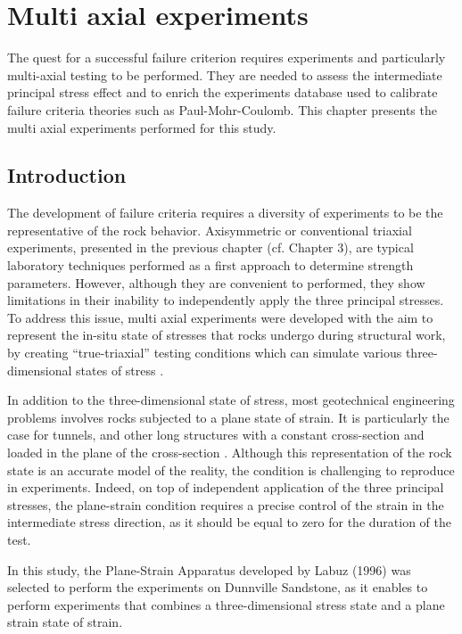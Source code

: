 \chapter{Multi axial experiments}\label{ch4:title}

The quest for a successful failure criterion requires experiments and particularly multi-axial testing \cite{Labuz2018} to be performed. They are needed to assess the intermediate principal stress effect and to enrich the experiments database used to calibrate failure criteria theories such as Paul-Mohr-Coulomb. This chapter presents the multi axial experiments performed for this study. 


\section{Introduction}

The development of failure criteria requires a diversity of experiments to be the representative of the rock behavior. Axisymmetric or conventional triaxial experiments, presented in the previous chapter (cf. Chapter 3), are typical laboratory techniques performed as a first approach to determine strength parameters. However, although they are convenient to performed, they show limitations in their inability to independently apply the three principal stresses. To address this issue, multi axial experiments were developed with the aim to represent the in-situ state of stresses that rocks undergo during structural work, by creating “true-triaxial” testing conditions which can simulate various three-dimensional states of stress \cite{Labuz2018} .

In addition to the three-dimensional state of stress, most geotechnical engineering problems involves rocks subjected to a plane state of strain. It is particularly the case for tunnels, and other long structures with a constant cross-section and loaded in the plane of the cross-section \cite{Jaeger1979}. Although this representation of the rock state is an accurate model of the reality, the condition is challenging to reproduce in experiments. Indeed, on top of independent application of the three principal stresses, the plane-strain condition requires a precise control of the strain in the intermediate stress direction, as it should be equal to zero for the duration of the test. 

In this study, the Plane-Strain Apparatus developed by Labuz (1996) \cite{Labuz1996}  was selected to perform the experiments on Dunnville Sandstone, as it enables to perform experiments that combines a three-dimensional stress state and a plane strain state of strain. 

